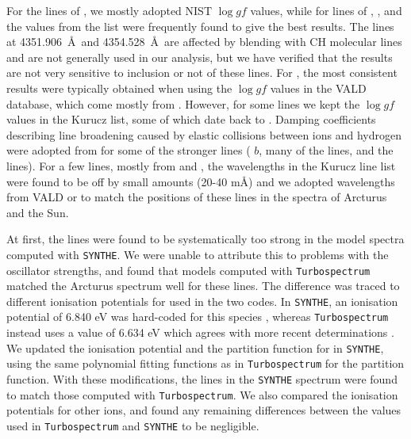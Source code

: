\documentclass{aa}
\begin{document}
For the lines of , we mostly adopted NIST $\log gf$ values,
while for lines of , , and  the values from the  list were frequently found to give the best results. 
The  lines at 4351.906~\AA\ and 4354.528~\AA\ are affected by blending with CH molecular lines and are not generally used in our analysis, but we have verified that the results are not very sensitive to inclusion or not of these lines. 
For , the most consistent results were typically obtained when using the $\log gf$ values in the VALD database, which come mostly from \citet{Smith1981}. However, for some  lines we kept the $\log gf$ values in the Kurucz list, some of which date back to \citet{Wiese1969}. Damping coefficients describing line broadening caused by elastic collisions between ions and hydrogen were adopted from \citet{Barklem2000} for some of the stronger lines ( $b$, many of the  lines, and the  lines). 
For a few lines, mostly from  and , the wavelengths in the Kurucz line list were found to be off by small amounts (20-40 m\AA) and we adopted wavelengths from VALD or  to match the positions of these lines in the spectra of Arcturus and the Sun. 

At first, the  lines were found to be systematically too strong in the model spectra computed with \texttt{SYNTHE}. We were unable to attribute this to problems with the oscillator strengths, and found that models computed with \texttt{Turbospectrum} matched the Arcturus spectrum well for these lines. The difference was traced to different ionisation potentials for  used in the two codes. In \texttt{SYNTHE}, an ionisation potential of 6.840 eV was hard-coded for this species \citep[from][]{Drawin1965}, whereas \texttt{Turbospectrum} instead uses a value of 6.634 eV which agrees with more recent determinations \citep{Liu2019}. We updated the  ionisation potential and the partition function for  in \texttt{SYNTHE}, using the same polynomial fitting functions as in \texttt{Turbospectrum} \citep{Irwin1981} for the partition function. With these modifications, the  lines in the \texttt{SYNTHE} spectrum were found to match those computed with \texttt{Turbospectrum}. 
We also compared the ionisation potentials for other ions, and found any remaining differences between the values used in  \texttt{Turbospectrum} and \texttt{SYNTHE} to be negligible. 
\end{document}
